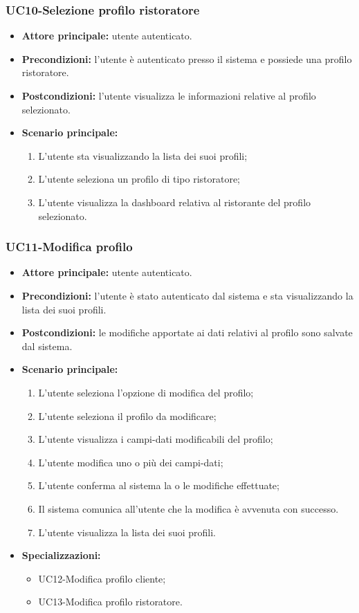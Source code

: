 \subsubsection{UC10-Selezione profilo ristoratore}
\begin{itemize}
\item \textbf{Attore principale:} utente autenticato.
\item \textbf{Precondizioni:} l'utente è autenticato presso il sistema e possiede una profilo ristoratore.
\item \textbf{Postcondizioni:} l'utente visualizza le informazioni relative al profilo selezionato.
\item \textbf{Scenario principale:}
\begin{enumerate}
    \item L'utente sta visualizzando la lista dei suoi profili;
    \item L'utente seleziona un profilo di tipo ristoratore;
    \item L'utente visualizza la dashboard relativa al ristorante del profilo selezionato.
\end{enumerate}
\end{itemize}

\subsubsection{UC11-Modifica profilo }
\begin{itemize}
\item \textbf{Attore principale:} utente autenticato.
\item \textbf{Precondizioni:} l'utente è stato autenticato dal sistema e sta visualizzando la lista dei suoi profili.
\item \textbf{Postcondizioni:} le modifiche apportate ai dati relativi al profilo sono salvate dal sistema.
\item \textbf{Scenario principale:}
\begin{enumerate}
    \item L'utente seleziona l'opzione di modifica del profilo;
    \item L'utente seleziona il profilo da modificare;
    \item L'utente visualizza i campi-dati modificabili del profilo;
    \item L'utente modifica uno o più dei campi-dati;
    \item L'utente conferma al sistema la o le modifiche effettuate;
    \item Il sistema comunica all'utente che la modifica è avvenuta con successo.
    \item L'utente visualizza la lista dei suoi profili.
\end{enumerate}
    \item \textbf{Specializzazioni:}
        \begin{itemize}
            \item UC12-Modifica profilo cliente;
            \item UC13-Modifica profilo ristoratore.
        \end{itemize}
\end{itemize}

